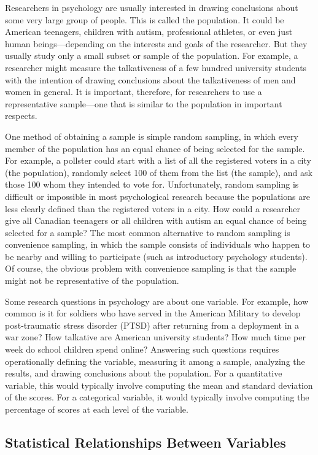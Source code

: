 \documentclass[]{book}
\theoremstyle{definition}
\theoremstyle{definition}
\theoremstyle{remark}
\begin{document}
Researchers in psychology are usually interested in drawing conclusions
about some very large group of people. This is called the population. It
could be American teenagers, children with autism, professional
athletes, or even just human beings---depending on the interests and
goals of the researcher. But they usually study only a small subset or
sample of the population. For example, a researcher might measure the
talkativeness of a few hundred university students with the intention of
drawing conclusions about the talkativeness of men and women in general.
It is important, therefore, for researchers to use a representative
sample---one that is similar to the population in important respects.

One method of obtaining a sample is simple random sampling, in which
every member of the population has an equal chance of being selected for
the sample. For example, a pollster could start with a list of all the
registered voters in a city (the population), randomly select 100 of
them from the list (the sample), and ask those 100 whom they intended to
vote for. Unfortunately, random sampling is difficult or impossible in
most psychological research because the populations are less clearly
defined than the registered voters in a city. How could a researcher
give all Canadian teenagers or all children with autism an equal chance
of being selected for a sample? The most common alternative to random
sampling is convenience sampling, in which the sample consists of
individuals who happen to be nearby and willing to participate (such as
introductory psychology students). Of course, the obvious problem with
convenience sampling is that the sample might not be representative of
the population.

Some research questions in psychology are about one variable. For
example, how common is it for soldiers who have served in the American
Military to develop post-traumatic stress disorder (PTSD) after
returning from a deployment in a war zone? How talkative are American
university students? How much time per week do school children spend
online? Answering such questions requires operationally defining the
variable, measuring it among a sample, analyzing the results, and
drawing conclusions about the population. For a quantitative variable,
this would typically involve computing the mean and standard deviation
of the scores. For a categorical variable, it would typically involve
computing the percentage of scores at each level of the variable.

\subsection{Statistical Relationships Between
Variables}\label{statistical-relationships-between-variables}
\end{document}
